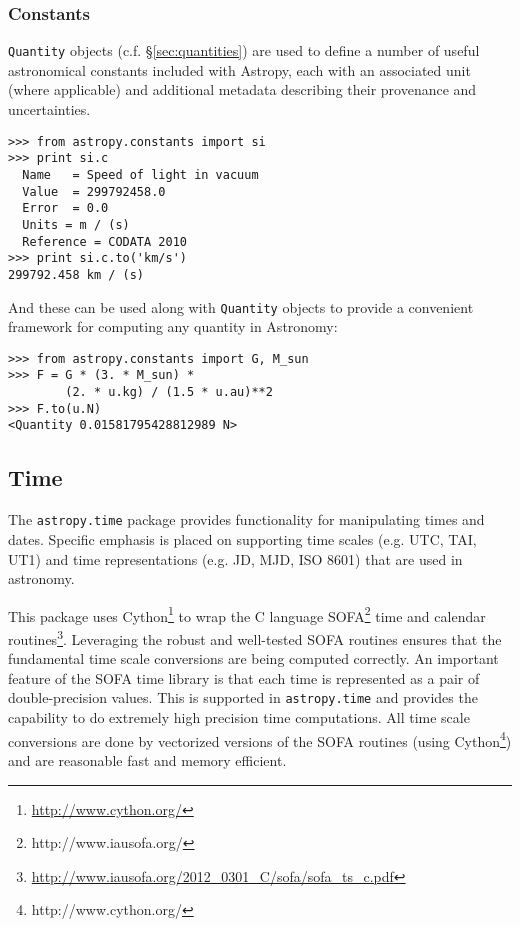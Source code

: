 \documentclass[traditabstract]{aa}
\begin{document}
\subsubsection{Constants}

\texttt{Quantity} objects (c.f. \S\ref{sec:quantities}) are used to define a
number of useful astronomical constants included with Astropy, each with an
associated unit (where applicable) and additional metadata describing their
provenance and uncertainties.
\begin{verbatim}
>>> from astropy.constants import si
>>> print si.c
  Name   = Speed of light in vacuum
  Value  = 299792458.0
  Error  = 0.0
  Units = m / (s)
  Reference = CODATA 2010
>>> print si.c.to('km/s')
299792.458 km / (s)
\end{verbatim}
And these can be used along with \texttt{Quantity} objects to provide a
convenient framework for computing any quantity in Astronomy:
\begin{verbatim}
>>> from astropy.constants import G, M_sun
>>> F = G * (3. * M_sun) *
        (2. * u.kg) / (1.5 * u.au)**2
>>> F.to(u.N)
<Quantity 0.01581795428812989 N>
\end{verbatim}

\subsection{Time}


The \texttt{astropy.time} package provides functionality for manipulating
times and dates.  Specific emphasis is placed on supporting time scales
(e.g. UTC, TAI, UT1) and time representations (e.g. JD, MJD, ISO 8601) that
are used in astronomy.

This package uses Cython\footnote{\url{http://www.cython.org/}} to wrap the C
language SOFA\footnote{http://www.iausofa.org/} time and calendar
routines\footnote{\url{http://www.iausofa.org/2012_0301_C/sofa/sofa_ts_c.pdf}}.
Leveraging the robust and well-tested
SOFA routines ensures that the
fundamental time scale conversions are being computed correctly.  An important
feature of the SOFA time library is that each time is represented as a pair of
double-precision values.  This is supported in \texttt{astropy.time} and
provides the capability to do extremely high precision time computations.  All
time scale conversions are done by vectorized versions of the SOFA
routines (using Cython\footnote{http://www.cython.org/}) and are reasonable fast and memory efficient.
\end{document}
